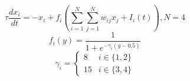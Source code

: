 \documentclass[11pt]{article}
\begin{document}
	
	\[\tau\frac{dx_i}{dt} = -x_i + f_i\left(\sum_{i=1}^{N} \sum_{j=1}^{N} w_{ij}x_j + I_i\left(t\right)\right), N=4\]
	\[f_i\left(y\right) = \frac{1}{1 + e^{-\gamma_i(y-0.5)}}\]
	\[\gamma_i =
		\begin{cases} 
		8 & i\in \{ 1,2 \}\\
		15 & i\in \{ 3,4 \}
		\end{cases}
	\]

	
\end{document}
